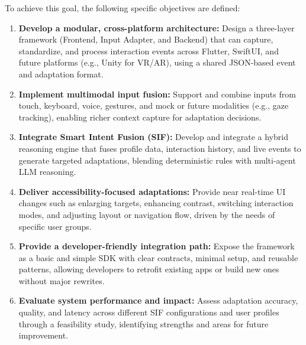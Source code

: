 To achieve this goal, the following specific objectives are defined:
\begin{enumerate}
    \item \textbf{Develop a modular, cross-platform architecture:} Design a three-layer framework (Frontend, Input Adapter, and Backend) that can capture, standardize, and process interaction events across Flutter, SwiftUI, and future platforms (e.g., Unity for VR/AR), using a shared JSON-based event and adaptation format.
    \item \textbf{Implement multimodal input fusion:} Support and combine inputs from touch, keyboard, voice, gestures, and mock or future modalities (e.g., gaze tracking), enabling richer context capture for adaptation decisions.
    \item \textbf{Integrate Smart Intent Fusion (SIF):} Develop and integrate a hybrid reasoning engine that fuses profile data, interaction history, and live events to generate targeted adaptations, blending deterministic rules with multi-agent LLM reasoning.
    \item \textbf{Deliver accessibility-focused adaptations:} Provide near real-time UI changes such as enlarging targets, enhancing contrast, switching interaction modes, and adjusting layout or navigation flow, driven by the needs of specific user groups.
    \item \textbf{Provide a developer-friendly integration path:} Expose the framework as a basic and simple SDK with clear contracts, minimal setup, and reusable patterns, allowing developers to retrofit existing apps or build new ones without major rewrites.
    \item \textbf{Evaluate system performance and impact:} Assess adaptation accuracy, quality, and latency across different SIF configurations and user profiles through a feasibility study, identifying strengths and areas for future improvement.
\end{enumerate}

\newpage 

